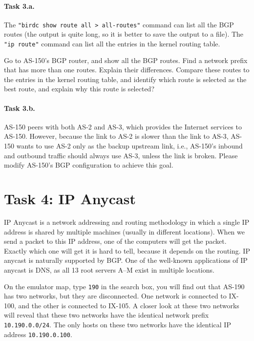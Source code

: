 \paragraph{Task 3.a.} The \texttt{"birdc show route all > all-routes"} command
can list all the BGP routes (the output is quite long, so it is better to
save the output to a file). The \texttt{"ip route"} command
can list all the entries in the kernel routing table. 

Go to AS-150's BGP router, and show all the BGP routes. Find a network prefix
that has more than one routes. Explain their differences. Compare these 
routes to the entries in the kernel routing table, and identify which route is 
selected as the best route, and explain why this route is selected? 


\paragraph{Task 3.b.}
AS-150 peers with both AS-2 and AS-3, which provides the 
Internet services to AS-150.
However, because the link to AS-2 is slower than
the link to AS-3, AS-150 wants 
to use AS-2 only as the backup upstream link, i.e., 
AS-150's inbound and outbound traffic should 
always use AS-3, unless the link is broken. 
Please modify AS-150's BGP configuration to achieve this goal.



\section{Task 4: IP Anycast} 

IP Anycast is a network addressing and routing methodology in which a single
IP address is shared by multiple machines (usually in different locations).
When we send a packet to this IP address, one of the computers will get 
the packet. Exactly which one will get it is hard to tell, because it depends
on the routing. IP anycast is naturally supported by BGP. 
One of the well-known applications of IP anycast is DNS, 
as all 13 root servers A–M exist in multiple locations. 


On the emulator map, type \texttt{190} in the search box, you will find 
out that AS-190 has two networks, but they are disconnected. One network
is connected to IX-100, and the other is connected to IX-105. A closer 
look at these two networks will reveal that these two networks have the 
identical network prefix \texttt{10.190.0.0/24}. The only hosts on
these two networks have the identical IP address \texttt{10.190.0.100}. 

